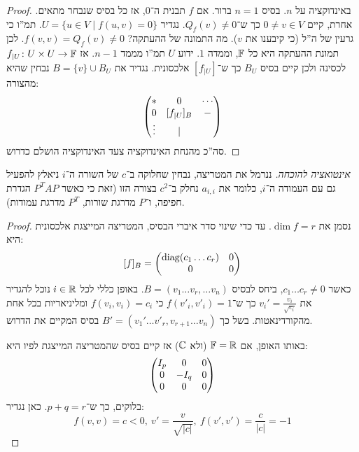 \documentclass[name=רשימות אלגברה לינארית 2א]{../../../tex/classes/megasumPreamble}
\begin{document}
	\begin{proof}
		באינדוקציה על $n$. בסיס $n = 1$ ברור. אם $f$ תבנית ה־$0$, אז כל בסיס שנבחר מתאים. אחרת, קיים $0 \neq v \in V$ כך ש־$Q_f(v) \neq 0$. נגדיר $U = \{u \in V \mid f(u, v) = 0\}$. תמ''ו כי גרעין של ה''ל (כי קיבענו את $v$). מה התמונה של ההעתקה? $f(v, v) = Q_f(v) \neq 0$. לכן תמונת ההעתקה היא כל $\mathbb{F}$, וממדה $1$. ידוע $U$ תמ''ו מממד $n - 1$. אז $f_{|U} \colon U\times U \to \mathbb{F}$ לכסינה ולכן קיים בסיס $B_U$ כך ש־$[f_{|U}]$ אלכסונית. נגדיר את $B = \{v\} \cup B_U$ נבחין שהיא מהצורה: 
		\[ \begin{pmatrix} * & 0& \cdots \\ 0 & [f_{|U}]_B& - \\ \vdots & \vert \end{pmatrix} \]
		סה''כ מהנחת האינדוקציה צעד האינדוקציה הושלם כדרוש. 
	\end{proof}
	
	
	\textit{אינטואציה להוכחה. }ננרמל את המטריצה, נבחין שחלוקה ב־$c$ של השורה ה־$i$ ניאלץ להפעיל גם עם העמודה ה־$i$, כלומר את $a_{i, i}$ נחלק ב־$c^{2}$ בצורה הזו (זאת כי כאשר $P^TAP$ הגדרת חפיפה, ו־$P$ מדרגת שורות, $P^{T}$ מדרגת עמודות). 
	\begin{proof}
		נסמן את $\dim f = r$. עד כדי שינוי סדר איברי הבסיס, המטריצה המייצגת אלכסונית היא:
		\[ [f]_B = \begin{pmatrix} \operatorname{diag}(c_1 \dots c_r) & 0 \\ 0 & 0 \end{pmatrix} \]
		כאשר $c_1 \dots c_r \neq 0$, ביחס לבסיס $B = (v_1 \dots v_r, \dots v_n)$. באופן כללי לכל $i \in \mathbb{R}$ נוכל להגדיר את $v_i' = \frac{v_i}{\sqrt{c_i}}$ כך ש־$f(v'_i, v'_i) = 1$ כי $f(v_i, v_i) = c_i$ ומליניאריות בכל אחת מהקורדינאטות. בשל כך $B' = (v_1' \dots v'_r, v_{r + 1} \dots v_n)$ בסיס המקיים את הדרוש. 
		
		באותו האופן, אם $\mathbb{F} = \mathbb{R}$ (ולא $\mathbb{C}$) אז קיים בסיס שהמטריצה המייצגת לפיו היא: 
		\[ \begin{pmatrix} I_p & 0 & 0 \\ 0& -I_q & 0 \\0 & 0 & 0 \end{pmatrix} \]
		בלוקים, כך ש־$p + q = r$. כאן נגדיר: 
		\[ f(v, v) = c < 0, \ v' = \frac{v}{\sqrt{|c|}}, \ f(v', v') = \frac{c}{|c|} = -1 \]\mathenvendproof
	\end{proof}
	
	
	
\end{document}

